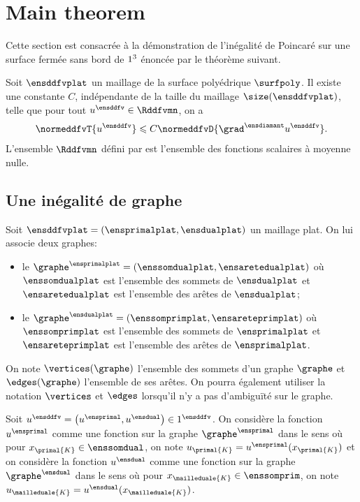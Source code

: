 \newpage
\section{Main theorem}

Cette section est consacrée à la démonstration de l'inégalité de Poincaré \ddfv sur une surface fermée sans bord de $1^3$ énoncée par le théorème suivant. 

\begin{theo} \label{theo:main}
    Soit $\ensddfvplat$ un maillage \ddfv de la surface polyédrique $\surfpoly$. Il existe une constante $C$, indépendante de la taille du maillage $\size(\ensddfvplat)$, telle que pour tout $u^\ensddfv \in \Rddfvmn$, on a
    \begin{equation} \label{eq:main_ddfv}
    \normeddfvT{u^\ensddfv} \leqslant C \normeddfvD{\grad^\ensdiamant u^\ensddfv}.
    \end{equation}
    L'ensemble $\Rddfvmn$ défini par  est l'ensemble des fonctions scalaires \ddfv à moyenne nulle. 
\end{theo}

\subsection{Une inégalité de graphe}

\begin{defi} \label{defi:graphe_ddfv}
Soit $\ensddfvplat= (\ensprimalplat, \ensdualplat)$ un maillage \ddfv plat. On lui associe deux graphes:
\begin{itemize}
    \item le  $\graphe^\ensprimalplat = (\enssomdualplat, \ensaretedualplat)$ où $\enssomdualplat$ est l'ensemble des sommets de $\ensdualplat$ et $\ensaretedualplat$ est l'ensemble des arêtes de $\ensdualplat$;
    \item le  $\graphe^\ensdualplat = (\enssomprimplat, \ensareteprimplat)$ où $\enssomprimplat$ est l'ensemble des sommets de $\ensprimalplat$ et $\ensareteprimplat$ est l'ensemble des arêtes de $\ensprimalplat$.
\end{itemize}
\end{defi}

\begin{envide}[Notations]
On note $\vertices(\graphe)$ l'ensemble des sommets d'un graphe $\graphe$ et $\edges(\graphe)$ l'ensemble de ses arêtes. On pourra également utiliser la notation $\vertices$ et $\edges$ lorsqu'il n'y a pas d'ambiguïté sur le graphe. 

Soit $u^\ensddfv = \big( u^\ensprimal, u^\ensdual \big) \in \R^\ensddfv$. On considère la fonction $u^\ensprimal$ comme une fonction sur la graphe $\graphe^\ensprimal$ dans le sens où pour $x_{\primal{K}} \in \enssomdual$, on note $u_{\primal{K}} = u^\ensprimal(x_{\primal{K}})$ et on considère la fonction $u^\ensdual$ comme une fonction sur la graphe $\graphe^\ensdual$ dans le sens où pour $x_{\mailleduale{K}} \in \enssomprim$, on note $u_{\mailleduale{K}} = u^\ensdual(x_{\mailleduale{K}})$.
\end{envide}

